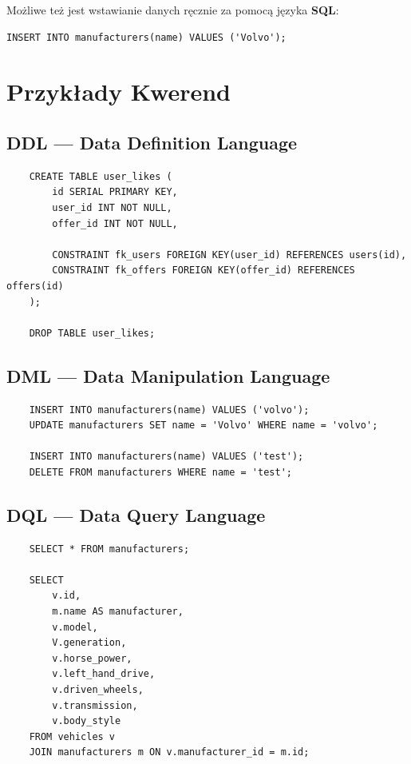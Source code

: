 \documentclass[a4paper,11pt]{article}
\begin{document}
Możliwe też jest wstawianie danych ręcznie za pomocą języka \textbf{SQL}:

\begin{verbatim}
INSERT INTO manufacturers(name) VALUES ('Volvo');
\end{verbatim}

\section*{Przykłady Kwerend}
\subsection*{DDL --- Data Definition Language}
\begin{verbatim}
    CREATE TABLE user_likes (
        id SERIAL PRIMARY KEY,
        user_id INT NOT NULL,
        offer_id INT NOT NULL,
        
        CONSTRAINT fk_users FOREIGN KEY(user_id) REFERENCES users(id),
        CONSTRAINT fk_offers FOREIGN KEY(offer_id) REFERENCES offers(id)
    );

    DROP TABLE user_likes;
\end{verbatim}

\subsection*{DML --- Data Manipulation Language}
\begin{verbatim}
    INSERT INTO manufacturers(name) VALUES ('volvo');
    UPDATE manufacturers SET name = 'Volvo' WHERE name = 'volvo';

    INSERT INTO manufacturers(name) VALUES ('test');
    DELETE FROM manufacturers WHERE name = 'test';
\end{verbatim}

\subsection*{DQL --- Data Query Language}
\begin{verbatim}
    SELECT * FROM manufacturers;

    SELECT 
        v.id, 
        m.name AS manufacturer,
        v.model,
        V.generation,
        v.horse_power,
        v.left_hand_drive,
        v.driven_wheels,
        v.transmission,
        v.body_style
    FROM vehicles v
    JOIN manufacturers m ON v.manufacturer_id = m.id;
\end{verbatim}
\end{document}
